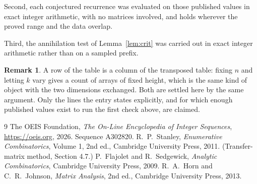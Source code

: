 \documentclass[11pt,a4paper]{article}
\theoremstyle{plain}
\theoremstyle{definition}
\newtheorem{remark}[theorem]{Remark}
\begin{document}
Second, each conjectured recurrence was evaluated on those published values in exact
integer arithmetic, with no matrices involved, and holds wherever the proved range and the
data overlap.

Third, the annihilation test of Lemma~\ref{lem:crit} was carried out in exact integer
arithmetic rather than on a sampled prefix.

\begin{remark}
A row of the table is a column of the transposed table: fixing $n$ and letting $k$ vary gives a
count of arrays of fixed height, which is the same kind of object with the two dimensions
exchanged. Both are settled here by the same argument. Only the lines the entry states
explicitly, and for which enough published values exist to run the first check above, are
claimed.
\end{remark}

\begin{thebibliography}{9}
 The OEIS Foundation, \emph{The On-Line Encyclopedia of Integer
Sequences}, \url{https://oeis.org}, 2026. Sequence A302820.
 R.~P.~Stanley, \emph{Enumerative Combinatorics}, Volume 1, 2nd ed.,
Cambridge University Press, 2011. (Transfer-matrix method, Section 4.7.)
 P.~Flajolet and R.~Sedgewick, \emph{Analytic Combinatorics}, Cambridge
University Press, 2009.
 R.~A.~Horn and C.~R.~Johnson, \emph{Matrix Analysis}, 2nd ed., Cambridge
University Press, 2013.
\end{thebibliography}
\end{document}
